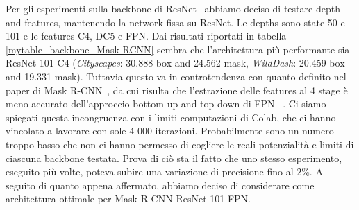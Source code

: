 \documentclass[10pt,twocolumn,letterpaper]{article}
\begin{document}
Per gli esperimenti sulla backbone di ResNet~\cite{Authors5_ResNet} abbiamo deciso di testare depth and features, mantenendo la network fissa su ResNet. Le depths sono state 50 e 101 e le features C4, DC5 e FPN. Dai risultati riportati in tabella \ref{mytable_backbone_Mask-RCNN} sembra che l'architettura pi\`u performante sia ResNet-101-C4 (\textit{Cityscapes}: 30.888 box and 24.562 mask, \textit{WildDash}: 20.459 box and 19.331 mask). Tuttavia questo va in controtendenza con quanto definito nel paper di Mask R-CNN~\cite{Authors1_maskrcnn}, da cui risulta che l'estrazione delle features al 4 stage \`e meno accurato dell'approccio bottom up and top down di FPN ~\cite{FPN}. Ci siamo spiegati questa incongruenza con i limiti computazioni di Colab, che ci hanno vincolato a lavorare con sole 4 000 iterazioni. Probabilmente sono un numero troppo basso che non  ci hanno permesso di cogliere le reali potenzialit\`a e limiti di ciascuna backbone testata. Prova di ci\`o sta il fatto che uno stesso esperimento, eseguito pi\`u volte, poteva subire una variazione di precisione fino al 2\%. A seguito di quanto appena affermato, abbiamo deciso di considerare come architettura ottimale per Mask R-CNN ResNet-101-FPN.
\end{document}
